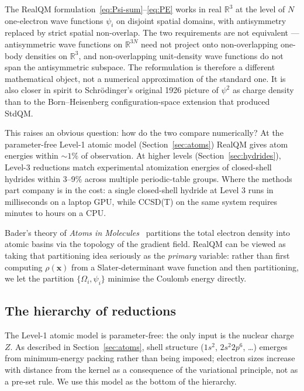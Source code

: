 \documentclass[11pt]{article}
\begin{document}
The RealQM formulation~\eqref{eq:Psi-sum}--\eqref{eq:PE} works in real $\mathbb{R}^3$ at the level of $N$ one-electron wave functions $\psi_i$ on disjoint spatial domains, with antisymmetry replaced by strict spatial non-overlap. The two requirements are not equivalent --- antisymmetric wave functions on $\mathbb{R}^{3N}$ need not project onto non-overlapping one-body densities on $\mathbb{R}^3$, and non-overlapping unit-density wave functions do not span the antisymmetric subspace. The reformulation is therefore a different mathematical object, not a numerical approximation of the standard one. It is also closer in spirit to Schr\"odinger's original 1926 picture of $\psi^2$ as charge density than to the Born--Heisenberg configuration-space extension that produced StdQM.

This raises an obvious question: how do the two compare numerically? At the parameter-free Level-1 atomic model (Section~\ref{sec:atoms}) RealQM gives atom energies within ${\sim}1\%$ of observation. At higher levels (Section~\ref{sec:hydrides}), Level-3 reductions match experimental atomization energies of closed-shell hydrides within 3--9\% across multiple periodic-table groups. Where the methods part company is in the cost: a single closed-shell hydride at Level 3 runs in milliseconds on a laptop GPU, while CCSD(T) on the same system requires minutes to hours on a CPU.

Bader's theory of \emph{Atoms in Molecules}~\cite{Bader90} partitions the total electron density into atomic basins via the topology of the gradient field. RealQM can be viewed as taking that partitioning idea seriously as the \emph{primary} variable: rather than first computing $\rho(\mathbf{x})$ from a Slater-determinant wave function and then partitioning, we let the partition $\{\Omega_i, \psi_i\}$ minimise the Coulomb energy directly.

\subsection{The hierarchy of reductions}

The Level-1 atomic model is parameter-free: the only input is the nuclear charge $Z$. As described in Section~\ref{sec:atoms}, shell structure ($1s^2$, $2s^2 2p^6$, \ldots) emerges from minimum-energy packing rather than being imposed; electron sizes increase with distance from the kernel as a consequence of the variational principle, not as a pre-set rule. We use this model as the bottom of the hierarchy.
\end{document}
